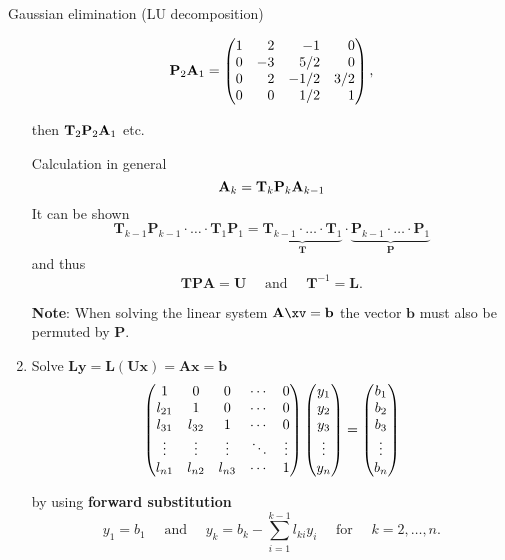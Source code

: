 \begin{vbframe}{Gaussian elimination (LU decomposition)}
\begin{enumerate}
$$
\mathbf{P}_2 \Amat_1 =
\begin{pmatrix*}[r]
1 &  2 & -1   & 0 \\
0 & -3 & 5/2  & 0 \\
0 &  2 & -1/2 & 3/2 \\
0 &  0 & 1/2  & 1 \end{pmatrix*},
$$

\normalsize

then $\mathbf{T}_2\mathbf{P}_2\mathbf{A}_1$ etc.

\framebreak

Calculation in general
$$
\mathbf{A}_k = \mathbf{T}_k\mathbf{P}_k\mathbf{A}_{k - 1}
$$
\medskip
It can be shown
$$
\mathbf{T}_{k - 1}\mathbf{P}_{k - 1} \cdot \ldots \cdot \mathbf{T}_{1}\mathbf{P}_{1} =
  \underbrace{\mathbf{T}_{k - 1} \cdot \ldots \cdot \mathbf{T}_{1}}_{\mathbf{T}} \cdot
  \underbrace{\mathbf{P}_{k - 1} \cdot \ldots \cdot \mathbf{P}_{1}}_{\mathbf{P}}
$$
and thus
$$
\mathbf{TPA} = \mathbf{U} \quad \text{ and } \quad \mathbf{T}^{-1} = \mathbf{L}.
$$

\textbf{Note}: When solving the linear system $\Amat \xv = \mathbf{b}$ the vector $\mathbf{b}$ must also be permuted by $\mathbf{P}$. 

\framebreak


\item Solve  $\mathbf{Ly} = \mathbf{L(Ux)} = \mathbf{Ax} = \mathbf{b}$
\footnotesize
$$
\begin{pmatrix} 
1       & 0     & 0       & \cdots & 0 \\
l_{21}  & 1     & 0       & \cdots & 0 \\
l_{31}  & l_{32}& 1       & \cdots & 0 \\
\vdots  & \vdots& \vdots  & \ddots & \vdots \\
l_{n1}  & l_{n2}& l_{n3}  & \cdots & 1  \end{pmatrix}
\begin{pmatrix} 
y_1 \\ y_2 \\ y_3 \\ \vdots \\ y_n
\end{pmatrix} = \begin{pmatrix}
b_1 \\ b_2 \\ b_3 \\ \vdots \\ b_n  \end{pmatrix}
$$
\normalsize

by using \textbf{forward substitution}
$$
y_1 = b_1 \quad \text{ and } \quad y_k = b_k - \sum_{i = 1}^{k - 1}l_{ki}y_i \quad
  \text{ for } \quad k = 2, \ldots, n.
$$


\end{enumerate}
\end{vbframe}
